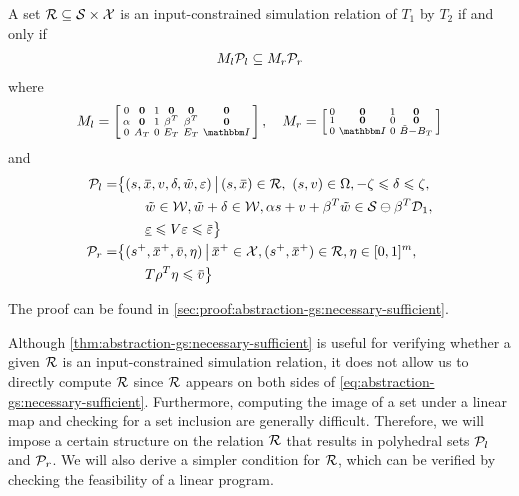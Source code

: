 \begin{theorem}
  \label{thm:abstraction-gs:necessary-sufficient}
  A set $\mathcal{R} \subseteq \mathcal{S} \times \mathcal{X}$ is an input-constrained simulation relation of $T_{1}$ by $T_{2}$ %
if and only if
  \begin{align}
    \label{eq:abstraction-gs:necessary-sufficient}
    M_l \mathcal{P}_l \subseteq M_r \mathcal{P}_r
  \end{align}
  where 
  \begin{gather*}
  M_l = \left[
  \begin{smallmatrix}
    0 & \Zero & 1 & \Zero & \Zero & \Zero \\
    \alpha & \Zero & 1 & \beta^{T} & \beta^{T} & \Zero \\
    0 & A_T & 0 & E_T & E_T & \IdentityMatrix
  \end{smallmatrix} \right], \quad
    M_r =
    \left[\begin{smallmatrix}
        0 & \Zero & 1 & \Zero \\
        1 & \Zero & 0 & \Zero \\
        0 & \IdentityMatrix & 0 & \tilde{B} - B_{T}
      \end{smallmatrix}\right]
  \end{gather*}
  and
  \begin{align*}
    \PSet_l =& \big\{ (s,\overbar{x}, v, \delta, \tilde{w}, \varepsilon) \,\big|\,
    (s,\overbar{x}) \in \RSet,\ (s,v) \in \Omega, -\zeta \leqslant \delta \leqslant \zeta,\big.\\
    &\qquad \big. \tilde{w} \in \WSet, \tilde{w} + \delta \in \WSet, \alpha s + v + \beta^{T} \tilde{w} \in \SSet \ominus \beta^{T} \mathcal{D}_{1},\\
    &\qquad \underline{\varepsilon} \leqslant V \varepsilon \leqslant \overbar{\varepsilon} \big\} \\
    \PSet_r =& \big\{(s^+, \overbar{x}^{+}, \overbar{v}, \eta) \,\big|\,
               \overbar{x}^{+} \in \XSet, (s^{+}, \overbar{x}^{+}) \in \RSet, \eta \in [0,1]^{m},\big.\\
             &\qquad \big. T \rho^{T} \eta \leqslant \overbar{v}\big\}
  \end{align*}
\end{theorem}
The proof can be found in \cref{sec:proof:abstraction-gs:necessary-sufficient}.

Although \cref{thm:abstraction-gs:necessary-sufficient} is useful for verifying whether a given $\mathcal{R}$ is an input-constrained simulation relation, it does not allow us to directly compute $\mathcal{R}$ since $\mathcal{R}$ appears on both sides of \eqref{eq:abstraction-gs:necessary-sufficient}.
Furthermore, computing the image of a set under a linear map and checking for a set inclusion are generally difficult.
Therefore, we will impose a certain structure on the relation $\mathcal{R}$ that results in polyhedral sets $\mathcal{P}_{l}$ and $\mathcal{P}_{r}$.
We will also derive a simpler condition for $\mathcal{R}$, which can be verified by checking the feasibility of a linear program.

